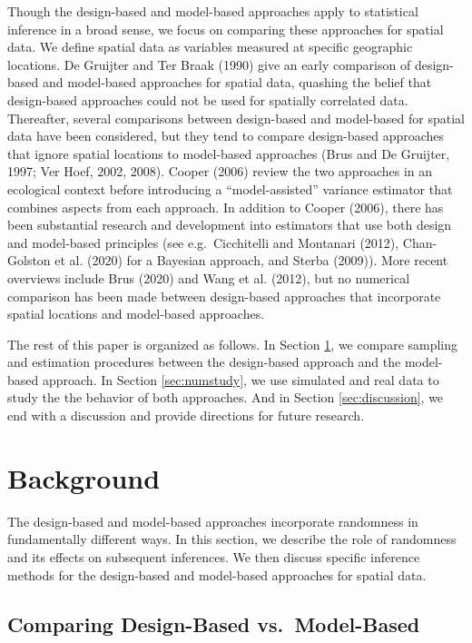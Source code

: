 \documentclass[]{elsarticle} %
\begin{document}
Though the design-based and model-based approaches apply to statistical
inference in a broad sense, we focus on comparing these approaches for
spatial data. We define spatial data as variables measured at specific
geographic locations. De Gruijter and Ter Braak (1990) give an early
comparison of design-based and model-based approaches for spatial data,
quashing the belief that design-based approaches could not be used for
spatially correlated data. Thereafter, several comparisons between
design-based and model-based for spatial data have been considered, but
they tend to compare design-based approaches that ignore spatial
locations to model-based approaches (Brus and De Gruijter, 1997; Ver
Hoef, 2002, 2008). Cooper (2006) review the two approaches in an
ecological context before introducing a ``model-assisted'' variance
estimator that combines aspects from each approach. In addition to
Cooper (2006), there has been substantial research and development into
estimators that use both design and model-based principles (see
e.g.~Cicchitelli and Montanari (2012), Chan-Golston et al. (2020) for a
Bayesian approach, and Sterba (2009)). More recent overviews include
Brus (2020) and Wang et al. (2012), but no numerical comparison has been
made between design-based approaches that incorporate spatial locations
and model-based approaches.

The rest of this paper is organized as follows. In Section
\ref{sec:background}, we compare sampling and estimation procedures
between the design-based approach and the model-based approach. In
Section \ref{sec:numstudy}, we use simulated and real data to study the
the behavior of both approaches. And in Section \ref{sec:discussion}, we
end with a discussion and provide directions for future research.

\hypertarget{sec:background}{%
\section{Background}\label{sec:background}}

The design-based and model-based approaches incorporate randomness in
fundamentally different ways. In this section, we describe the role of
randomness and its effects on subsequent inferences. We then discuss
specific inference methods for the design-based and model-based
approaches for spatial data.

\hypertarget{comparing-design-based-vs.-model-based}{%
\subsection{Comparing Design-Based
vs.~Model-Based}\label{comparing-design-based-vs.-model-based}}
\end{document}
